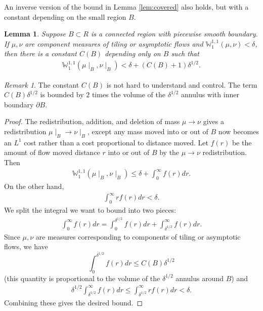 \documentclass[11pt]{article}
\newtheorem{lemma}[thm]{Lemma}
\theoremstyle{remark}
\newtheorem{rem}[thm]{Remark}
\theoremstyle{definition}
\newcommand{\m}[1]{\mathbb{#1}}
\begin{document}
An inverse version of the bound in Lemma \ref{lem:covered} also holds, but with a constant depending on the small region $B$.
\begin{lemma}\label{lem:constant_order_box_Wass_bound}
Suppose $B\subset R$ is a connected region with piecewise smooth boundary. If $\mu, \nu$ are component measures of tiling or asymptotic flows and $\m W_1^{1,1}(\mu,\nu)<\delta$, then there is a constant $C(B)$ depending only on $B$ such that
\begin{align*}
    \m W_1^{1,1}(\mu\mid_B, \nu\mid_B) < \delta + (C(B)+1) \delta^{1/2}.
\end{align*}
\end{lemma}
\begin{rem}\label{rem:constant_explained}
    The constant $C(B)$ is not hard to understand and control. The term $C(B)\delta^{1/2}$ is bounded by $2$ times the volume of the $\delta^{1/2}$ annulus with inner boundary $\partial B$. 
\end{rem}
\begin{proof}
    The redistribution, addition, and deletion of mass $\mu \to \nu$ gives a redistribution $\mu\mid_B\to \nu\mid_B$, except any mass moved into or out of $B$ now becomes an $L^1$ cost rather than a cost proportional to distance moved. Let $f(r)$ be the amount of flow moved distance $r$ into or out of $B$ by the $\mu\to \nu$ redistribution. Then 
    \begin{align*}
        \m W_1^{1,1}(\mu\mid_B,\nu\mid_B) \leq \delta + \int_0^\infty f(r) dr. 
    \end{align*}
    On the other hand, 
    \begin{align*}
        \int_{0}^\infty r f(r) dr < \delta. 
    \end{align*}
    We split the integral we want to bound into two pieces: 
    \begin{align*}
        \int_{0}^\infty f(r) dr = \int_{0}^{\delta^{1/2}} f(r) dr + \int_{\delta^{1/2}}^\infty f(r) dr. 
    \end{align*}
    Since $\mu,\nu$ are measures corresponding to components of tiling or asymptotic flows, we have $$\int_{0}^{\delta^{1/2}} f(r) dr \leq C(B) \delta^{1/2}$$ (this quantity is proportional to the volume of the $\delta^{1/2}$ annulus around $B$) and
    \begin{align*}
       \delta^{1/2} \int_{\delta^{1/2}}^\infty f(r) dr \leq \int_{\delta^{1/2}}^\infty r f(r) dr < \delta. 
    \end{align*}
    Combining these gives the desired bound. 
\end{proof}
\end{document}
